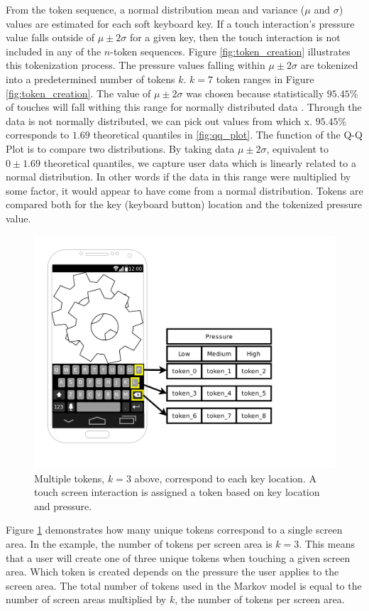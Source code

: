 \documentclass{acm_proc_article-sp}
\begin{document}
From the token sequence,
a normal distribution mean and variance ($\mu$ and $\sigma$) values are estimated for each soft keyboard key.
%
If a touch interaction's pressure value falls outside of
$\mu \pm 2\sigma$ for a given key, 
then the touch interaction is not included in any of the $n$-token sequences. 
Figure \ref{fig:token_creation} illustrates 
this tokenization process.
The pressure values falling within $\mu \pm 2\sigma$ are tokenized
into a predetermined number of tokens $k$. 
$k=7$ token ranges in Figure \ref{fig:token_creation}.
The value of $\mu \pm 2\sigma$ was chosen because statistically $95.45$\% of touches 
will fall withing this range for normally distributed data \cite{threesigmarule}.
%
Through the data is not normally distributed,
we can pick out values from which x.
$95.45$\% corresponds to $1.69$ theoretical quantiles in \ref{fig:qq_plot}.
The function of the Q-Q Plot is to 
compare two distributions.
By taking data $\mu \pm 2\sigma$,
equivalent to $0 \pm 1.69$ theoretical quantiles,
we capture user data which is
linearly related to a normal distribution.
In other words if the data in this range
were multiplied by some factor,
it would appear to have come from a normal distribution.
%
Tokens are compared both for the key (keyboard button) location and the tokenized pressure value.

\begin{figure}
\centering
\includegraphics[width=.45\textwidth, keepaspectratio]{phone_tokens.pdf}
\caption{
Multiple tokens, $k=3$ above, correspond to each key location.
A touch screen interaction is assigned a token based on
key location and pressure.
}
\label{fig:phone_tokens}
\end{figure}

Figure \ref{fig:phone_tokens} demonstrates how
many unique tokens correspond to a single screen area.
In the example, the number of tokens per screen area is $k=3$.
This means that a user will create one of three unique tokens
when touching a given screen area.
Which token is created depends on the pressure 
the user applies to the screen area.
The total number of tokens used in the Markov model is equal
to the number of screen areas multiplied by $k$,
the number of tokens per screen area.
\end{document}
